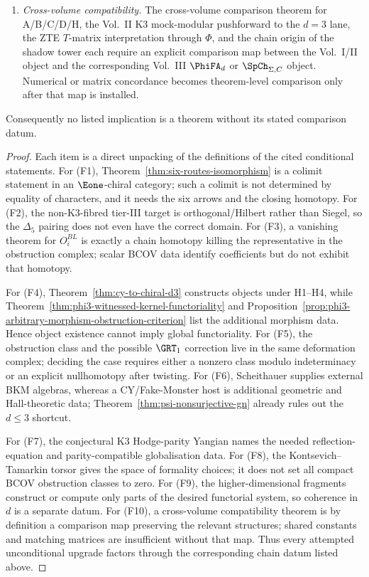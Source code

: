 \begin{theorem}
\begin{enumerate}[label=\textup{(F\arabic*)}]
 \item \emph{Cross-volume compatibility.} The cross-volume comparison
 theorem for A/B/C/D/H, the Vol.~II K3 mock-modular pushforward to the
 $d=3$ lane, the ZTE $T$-matrix interpretation through $\Phi$, and the
 chain origin of the shadow tower each require an explicit comparison
 map between the Vol.~I/II object and the corresponding Vol.~III
$\PhiFA_d$ or $\SpCh_{\Sigma,C}$ object. Numerical or matrix
concordance becomes theorem-level comparison only after that map is
installed.
\end{enumerate}
Consequently no listed implication is a theorem without its stated
comparison datum.
\end{theorem}

\begin{proof}
Each item is a direct unpacking of the definitions of the cited
conditional statements. For (F1), Theorem~\ref{thm:six-routes-isomorphism}
is a colimit statement in an $\Eone$-chiral category; such a colimit is
not determined by equality of characters, and it needs the six arrows
and the closing homotopy. For (F2), the non-K3-fibred tier-III target
is orthogonal/Hilbert rather than Siegel, so the $\Delta_5$ pairing
does not even have the correct domain. For (F3), a vanishing theorem
for $O_i^{BL}$ is exactly a chain homotopy killing the representative
in the obstruction complex; scalar BCOV data identify coefficients but
do not exhibit that homotopy.

For (F4), Theorem~\ref{thm:cy-to-chiral-d3} constructs objects under
H1--H4, while Theorem~\ref{thm:phi3-witnessed-kernel-functoriality}
and Proposition~\ref{prop:phi3-arbitrary-morphism-obstruction-criterion}
list the additional morphism data. Hence object existence cannot imply
global functoriality. For (F5), the obstruction class and the possible
$\GRT_1$ correction live in the same deformation complex; deciding the
case requires either a nonzero class modulo indeterminacy or an
explicit nullhomotopy after twisting. For (F6), Scheithauer supplies
external BKM algebras, whereas a CY/Fake-Monster host is additional
geometric and Hall-theoretic data; Theorem~\ref{thm:psi-nonsurjective-gn}
already rules out the $d\leq3$ shortcut.

For (F7), the conjectural K3 Hodge-parity Yangian names the needed
reflection-equation and parity-compatible globalisation data. For
(F8), the Kontsevich--Tamarkin torsor gives the space of formality
choices; it does not set all compact BCOV obstruction classes to zero.
For (F9), the higher-dimensional fragments construct or compute only
parts of the desired functorial system, so coherence in $d$ is a
separate datum. For (F10), a cross-volume compatibility theorem is by
definition a comparison map preserving the relevant structures; shared
constants and matching matrices are insufficient without that map.
Thus every attempted unconditional upgrade factors through the
corresponding chain datum listed above.
\end{proof}


